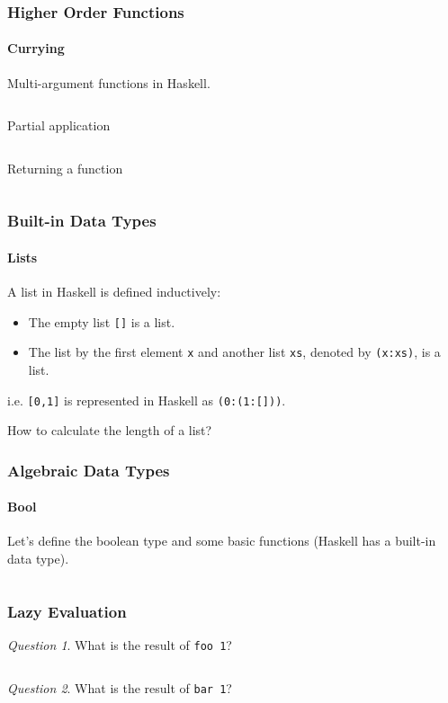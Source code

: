 \documentclass{beamer}
\theoremstyle{definition}
\theoremstyle{remark}
\theoremstyle{example}
\newtheorem{question}{Question}
\begin{document}
\begin{frame}[fragile]
  \frametitle{Higher Order Functions}
  \framesubtitle{Currying}
  Multi-argument functions in Haskell.
  \inputminted{haskell}{codes/max.hs} \pause
  \vspace{0.2cm}
  Partial application
  \inputminted{haskell}{codes/partial-max.hs} \pause
  \vspace{0.2cm}
  Returning a function
  \inputminted{haskell}{codes/func-sum.hs}
\end{frame}

\begin{frame}[fragile]
  \frametitle{Built-in Data Types}
  \framesubtitle{Lists}
  A list in Haskell is defined inductively:
  \begin{itemize}
    \item The empty list \texttt{[]} is a list.
    \item The list by the first element \texttt{x} and another list
      \texttt{xs}, denoted by \texttt{(x:xs)}, is a list.
    \end{itemize}
    i.e. \texttt{[0,1]} is represented in Haskell as \texttt{(0:(1:[]))}. \pause
  \begin{example}
    How to calculate the length of a list?
    \begin{overlayarea}{\textwidth}{0.17\textheight}
    \end{overlayarea}
  \end{example}
\end{frame}

\begin{frame}[fragile]
  \frametitle{Algebraic Data Types}
  \framesubtitle{Bool}%
  Let's define the boolean type and some basic functions (Haskell has a built-in
  data type). \pause
  \inputminted{haskell}{codes/bool-test.hs}
\end{frame}

\begin{frame}[fragile]
  \frametitle{Lazy Evaluation}
  \begin{question}
    What is the result of \texttt{foo 1}?
    \inputminted{haskell}{codes/foo.hs}
  \end{question} \pause
  \begin{question}
    What is the result of \texttt{bar 1}?
    \begin{multicols}{2}
      \columnbreak
    \end{multicols}
  \end{question}
\end{frame}
\end{document}
